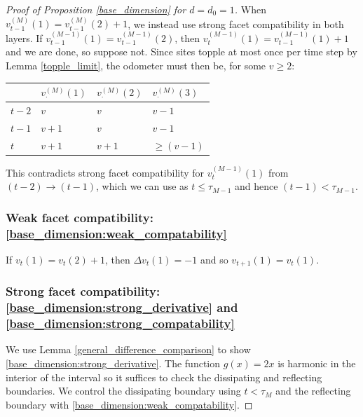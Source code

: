 \documentclass[12pt]{amsart}
\begin{document}
\begin{proof}[Proof of Proposition \ref{base_dimension} for $d=d_0 = 1$]
		When $v_{t-1}^{(M)}(1) = v_{t-1}^{(M)}(2) + 1$, we instead use strong facet compatibility 
		in both layers. If $v_{t-1}^{(M-1)}(1) = v_{t-1}^{(M-1)}(2)$, then $v_{t}^{(M-1)}(1) = v_{t-1}^{(M-1)}(1) + 1$ and we are done, so suppose not. Since sites topple at most once per time step by Lemma \ref{topple_limit}, 
		the odometer must then be,  for some $v \geq 2$:
		\begin{center}
			\begin{tabular}{l | l | l | l }
				& $v_{\cdot}^{(M)}(1)$ & $v_{\cdot}^{(M)}(2)$ & $v_{\cdot}^{(M)}(3)$ \\  \hline
				$t-2$ & $v$ & $v$ & $v-1$    \\
				$t-1$  & $v+1$ & $v$  & $v-1$  \\   
				$t$  & $v+1$ & $v+1$ & $\geq (v-1)$
			\end{tabular}
		\end{center}
		This contradicts strong facet compatibility for $v_t^{(M-1)}(1)$ from $(t-2) \to (t-1)$, which 
		we can use as $t \leq \tau_{M-1}$ and hence $(t-1) < \tau_{M-1}$.
		
		\subsubsection*{Weak facet compatibility: \eqref{base_dimension:weak_compatability}} \label{subsubsec:one_dim_weak_facet}
		If $v_t(1) = v_t(2) + 1$, then $\Delta v_t(1) = -1$ and so $v_{t+1}(1) = v_{t}(1)$. 
		
		
		
		
		
		\subsubsection*{Strong facet compatibility: \eqref{base_dimension:strong_derivative} and \eqref{base_dimension:strong_compatability}} \label{subsubsec:one_dim_strong_facet} 
		
		We use Lemma \ref{general_difference_comparison} to show \eqref{base_dimension:strong_derivative}.
		The function $g(x) = 2 x$ is harmonic in the interior of the interval so it suffices to check 
		the dissipating and reflecting boundaries. We control the dissipating boundary using $t < \tau_M$
		and the reflecting boundary with \eqref{base_dimension:weak_compatability}. 
		

\end{proof}
\end{document}
